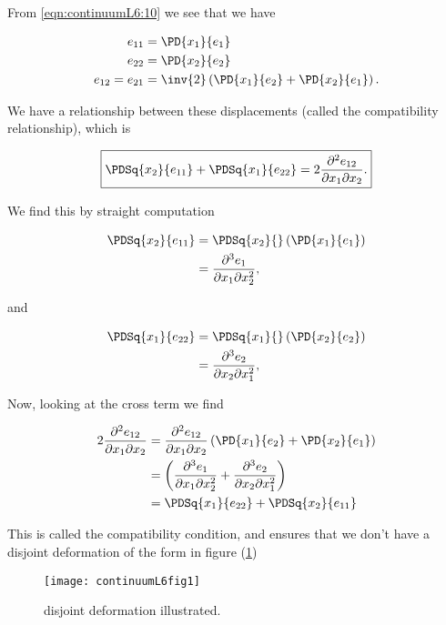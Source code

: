 From \ref{eqn:continuumL6:10} we see that we have

\begin{align}\label{eqn:continuumL6:70}
e_{11} &= \PD{x_1}{e_1} \\
e_{22} &= \PD{x_2}{e_2} \\
e_{12} = e_{21} &= 
\inv{2} \left( 
\PD{x_1}{e_2}
+ \PD{x_2}{e_1} 
\right).
\end{align}

We have a relationship between these displacements (called the compatibility relationship), which is

\begin{equation}\label{eqn:continuumL6:110}
\boxed{
\PDSq{x_2}{e_{11}} +
\PDSq{x_1}{e_{22}} = 
2
\frac{\partial^2 e_{12}}{\partial x_1 \partial x_2}.
}
\end{equation}

We find this by straight computation

\begin{align*}
\PDSq{x_2}{e_{11}} 
&= 
\PDSq{x_2}{}\left( 
\PD{x_1}{e_1}
\right) \\
&=
\frac{\partial^3 e_1}{\partial x_1 \partial x_2^2},
\end{align*}

and

\begin{align*}
\PDSq{x_1}{e_{22}} 
&= 
\PDSq{x_1}{}\left( 
\PD{x_2}{e_2}
\right) \\
&= 
\frac{\partial^3 e_2}{\partial x_2 \partial x_1^2},
\end{align*}

Now, looking at the cross term we find

\begin{align*}
2 \frac{\partial^2 e_{12}}{\partial x_1 \partial x_2} 
&= 
\frac{\partial^2 e_{12}}{\partial x_1 \partial x_2} 
\left(
\PD{x_1}{e_2}
+ \PD{x_2}{e_1} 
\right) \\
&=
\left(
\frac{\partial^3 e_1}{\partial x_1 \partial x_2^2} 
+
\frac{\partial^3 e_2}{\partial x_2 \partial x_1^2} 
\right) \\
&=
\PDSq{x_1}{e_{22}} 
+\PDSq{x_2}{e_{11}} 
\end{align*}

This is called the compatibility condition, and ensures that we don't have a disjoint deformation of the form in figure (\ref{fig:continuumL6:continuumL6fig1})

\begin{figure}[htp]
   \centering
   \texttt{[image: continuumL6fig1]}
   \caption{disjoint deformation illustrated.}\label{fig:continuumL6:continuumL6fig1}
\end{figure}

